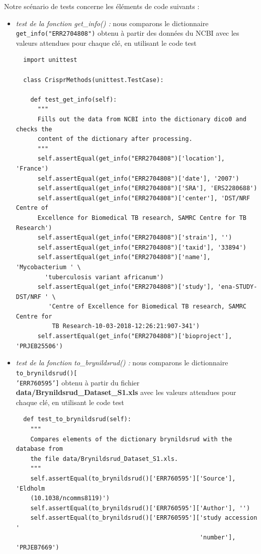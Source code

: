 \documentclass[twoside,a4paper,11pt,frenchb,openany]{report}
\begin{document}
Notre scénario de tests concerne les éléments de code suivants :

\begin{itemize}
\item \textit{test de la fonction get\_info() :} nous comparons le dictionnaire \texttt{get\_info("ERR2704808")} obtenu à partir des données du NCBI avec les valeurs attendues pour chaque clé, en utilisant le code test
\begin{verbatim}
  import unittest
  
  class CrisprMethods(unittest.TestCase):

    def test_get_info(self):
      """
      Fills out the data from NCBI into the dictionary dico0 and checks the
      content of the dictionary after processing.
      """
      self.assertEqual(get_info("ERR2704808")['location'], 'France')
      self.assertEqual(get_info("ERR2704808")['date'], '2007')
      self.assertEqual(get_info("ERR2704808")['SRA'], 'ERS2280688')
      self.assertEqual(get_info("ERR2704808")['center'], 'DST/NRF Centre of 
      Excellence for Biomedical TB research, SAMRC Centre for TB Research')
      self.assertEqual(get_info("ERR2704808")['strain'], '')
      self.assertEqual(get_info("ERR2704808")['taxid'], '33894')
      self.assertEqual(get_info("ERR2704808")['name'], 'Mycobacterium ' \
        'tuberculosis variant africanum')
      self.assertEqual(get_info("ERR2704808")['study'], 'ena-STUDY-DST/NRF ' \
         'Centre of Excellence for Biomedical TB research, SAMRC Centre for 
          TB Research-10-03-2018-12:26:21:907-341')
      self.assertEqual(get_info("ERR2704808")['bioproject'], 'PRJEB25506')
\end{verbatim}
\item \textit{test de la fonction to\_brynildsrud() :} nous comparons le dictionnaire \texttt{to\_brynildsrud()[\\'ERR760595']} obtenu à partir du fichier \textbf{data/Brynildsrud\_Dataset\_S1.xls} avec les valeurs attendues pour chaque clé, en utilisant le code test
\begin{verbatim}
  def test_to_brynildsrud(self):
    """
    Compares elements of the dictionary brynildsrud with the database from
    the file data/Brynildsrud_Dataset_S1.xls.
    """
    self.assertEqual(to_brynildsrud()['ERR760595']['Source'], 'Eldholm 
    (10.1038/ncomms8119)')
    self.assertEqual(to_brynildsrud()['ERR760595']['Author'], '')
    self.assertEqual(to_brynildsrud()['ERR760595']['study accession '
                                                   'number'], 'PRJEB7669')

\end{verbatim}
\end{itemize}
\end{document}
